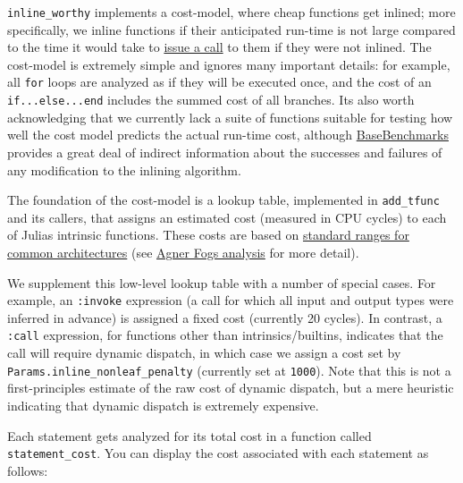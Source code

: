 \texttt{inline\_worthy} implements a cost-model, where {\textquotedbl}cheap{\textquotedbl} functions get inlined; more specifically, we inline functions if their anticipated run-time is not large compared to the time it would take to \href{https://en.wikipedia.org/wiki/Calling\_convention}{issue a call} to them if they were not inlined. The cost-model is extremely simple and ignores many important details: for example, all \texttt{for} loops are analyzed as if they will be executed once, and the cost of an \texttt{if...else...end} includes the summed cost of all branches. It{\textquotesingle}s also worth acknowledging that we currently lack a suite of functions suitable for testing how well the cost model predicts the actual run-time cost, although \href{https://github.com/JuliaCI/BaseBenchmarks.jl}{BaseBenchmarks} provides a great deal of indirect information about the successes and failures of any modification to the inlining algorithm.



The foundation of the cost-model is a lookup table, implemented in \texttt{add\_tfunc} and its callers, that assigns an estimated cost (measured in CPU cycles) to each of Julia{\textquotesingle}s intrinsic functions. These costs are based on \href{http://ithare.com/wp-content/uploads/part101\_infographics\_v08.png}{standard ranges for common architectures} (see \href{https://www.agner.org/optimize/instruction\_tables.pdf}{Agner Fog{\textquotesingle}s analysis} for more detail).



We supplement this low-level lookup table with a number of special cases. For example, an \texttt{:invoke} expression (a call for which all input and output types were inferred in advance) is assigned a fixed cost (currently 20 cycles). In contrast, a \texttt{:call} expression, for functions other than intrinsics/builtins, indicates that the call will require dynamic dispatch, in which case we assign a cost set by \texttt{Params.inline\_nonleaf\_penalty} (currently set at \texttt{1000}). Note that this is not a {\textquotedbl}first-principles{\textquotedbl} estimate of the raw cost of dynamic dispatch, but a mere heuristic indicating that dynamic dispatch is extremely expensive.



Each statement gets analyzed for its total cost in a function called \texttt{statement\_cost}. You can display the cost associated with each statement as follows:




